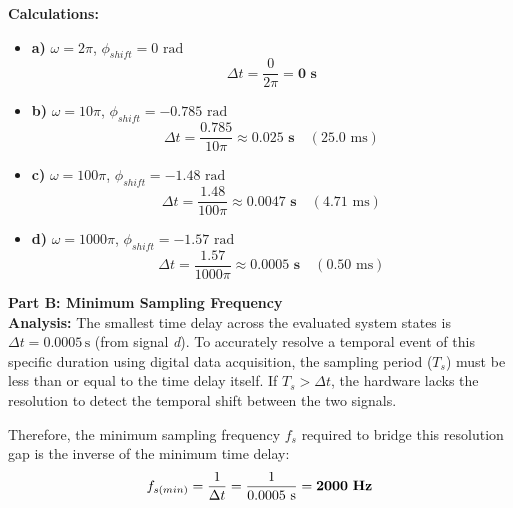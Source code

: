 \documentclass[11pt]{article}
\begin{document}
\textbf{Calculations:}
\begin{itemize}
\item \textbf{a)} $\omega = 2\pi$, $\phi_{shift} = 0 \text{ rad}$
\[ \Delta t = \frac{0}{2\pi} = \mathbf{0 \text{ s}} \]

\item \textbf{b)} $\omega = 10\pi$, $\phi_{shift} = -0.785 \text{ rad}$
\[ \Delta t = \frac{0.785}{10\pi} \approx \mathbf{0.025 \text{ s}} \quad (25.0 \text{ ms}) \]

\item \textbf{c)} $\omega = 100\pi$, $\phi_{shift} = -1.48 \text{ rad}$
\[ \Delta t = \frac{1.48}{100\pi} \approx \mathbf{0.0047 \text{ s}} \quad (4.71 \text{ ms}) \]

\item \textbf{d)} $\omega = 1000\pi$, $\phi_{shift} = -1.57 \text{ rad}$
\[ \Delta t = \frac{1.57}{1000\pi} \approx \mathbf{0.0005 \text{ s}} \quad (0.50 \text{ ms}) \]
\end{itemize}

\textbf{Part B: Minimum Sampling Frequency} \\
\textbf{Analysis:}
The smallest time delay across the evaluated system states is $\Delta t = 0.0005\,\text{s}$ (from signal \textit{d}). To accurately resolve a temporal event of this specific duration using digital data acquisition, the sampling period ($T_s$) must be less than or equal to the time delay itself. If $T_s > \Delta t$, the hardware lacks the resolution to detect the temporal shift between the two signals.

Therefore, the minimum sampling frequency $f_{s}$ required to bridge this resolution gap is the inverse of the minimum time delay:
\[ f_{s(min)} = \frac{1}{\Delta t} = \frac{1}{0.0005 \text{ s}} = \mathbf{2000 \text{ \textbf{Hz}}} \]
\end{document}
